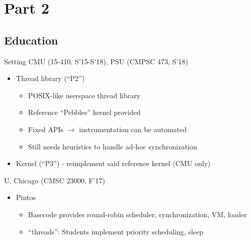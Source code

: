 \documentclass[xcolor=dvipsnames]{beamer}
\begin{document}

\section{Part 2}
\subsection{Education}


\begin{frame}{Setting}
	CMU (15-410, S'15-S'18), PSU (CMPSC 473, S'18)
	\begin{itemize}
		\item Thread library (``P2'')
			\begin{itemize}
				\item POSIX-like userspace thread library %
				\item Reference ``Pebbles'' kernel provided
				\item Fixed APIs $\rightarrow$ instrumentation can be automated
				\item Still needs heuristics to handle ad-hoc synchronization
			\end{itemize}
		\item Kernel (``P3'') - reimplement said reference kernel (CMU only)
	\end{itemize}
	\pause
	\linegap

	U. Chicago (CMSC 23000, F'17)
	\begin{itemize}
		\item Pintos %
		\begin{itemize}
			\item Basecode provides round-robin scheduler, synchronization, VM, loader
			\item ``threads'': Students implement priority scheduling, sleep


\end{itemize}
\end{itemize}
\end{frame}
\end{document}
